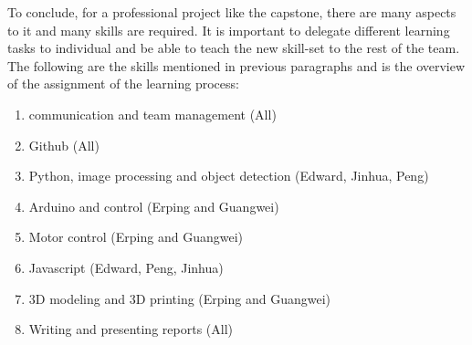 \documentclass[12pt]{article}
\begin{document}
To conclude, for a professional project like the capstone, there are many aspects to it and many skills are required. It is important to delegate different learning tasks to individual and be able to teach the new skill-set to the rest of the team. The following are the skills mentioned in previous paragraphs and is the overview of the assignment of the learning process:


\begin{enumerate}
  \item communication and team management (All)
  \item Github (All)
  \item Python, image processing and object detection (Edward, Jinhua, Peng)
  \item Arduino and control (Erping and Guangwei)
  \item Motor control (Erping and Guangwei)
  \item Javascript (Edward, Peng, Jinhua)
  \item 3D modeling and 3D printing (Erping and Guangwei)
  \item Writing and presenting reports (All)
\end{enumerate}
\end{document}
